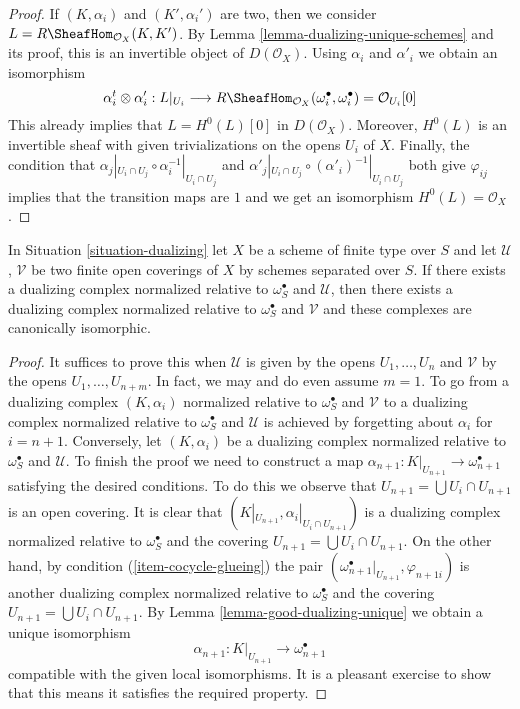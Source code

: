 \begin{proof}
If $(K, \alpha_i)$ and $(K', \alpha_i')$ are two, then we consider
$L = R\SheafHom_{\mathcal{O}_X}(K, K')$.
By Lemma \ref{lemma-dualizing-unique-schemes}
and its proof, this is an invertible object of $D(\mathcal{O}_X)$.
Using $\alpha_i$ and $\alpha'_i$ we obtain an isomorphism
$$
\alpha_i^t \otimes \alpha'_i :
L|_{U_i} \longrightarrow
R\SheafHom_{\mathcal{O}_X}(\omega_i^\bullet, \omega_i^\bullet) =
\mathcal{O}_{U_i}[0]
$$
This already implies that $L = H^0(L)[0]$ in $D(\mathcal{O}_X)$.
Moreover, $H^0(L)$ is an invertible sheaf with given trivializations
on the opens $U_i$ of $X$. Finally, the condition that
$\alpha_j|_{U_i \cap U_j} \circ \alpha_i^{-1}|_{U_i \cap U_j}$
and
$\alpha'_j|_{U_i \cap U_j} \circ (\alpha'_i)^{-1}|_{U_i \cap U_j}$
both give $\varphi_{ij}$ implies that the transition maps
are $1$ and we get an isomorphism $H^0(L) = \mathcal{O}_X$.
\end{proof}

\begin{lemma}
\label{lemma-good-dualizing-independence-covering}
In Situation \ref{situation-dualizing} let $X$ be a scheme of finite type
over $S$ and let $\mathcal{U}$, $\mathcal{V}$ be two finite open coverings
of $X$ by schemes separated over $S$.
If there exists a dualizing complex normalized
relative to $\omega_S^\bullet$ and $\mathcal{U}$, then
there exists a dualizing complex normalized relative to
$\omega_S^\bullet$ and $\mathcal{V}$ and these complexes are
canonically isomorphic.
\end{lemma}

\begin{proof}
It suffices to prove this when $\mathcal{U}$ is given by the opens
$U_1, \ldots, U_n$ and $\mathcal{V}$ by the opens $U_1, \ldots, U_{n + m}$.
In fact, we may and do even assume $m = 1$.
To go from a dualizing complex $(K, \alpha_i)$ normalized
relative to $\omega_S^\bullet$ and $\mathcal{V}$ to a
dualizing complex normalized relative to $\omega_S^\bullet$ and $\mathcal{U}$
is achieved by forgetting about $\alpha_i$ for $i = n + 1$. Conversely, let
$(K, \alpha_i)$ be a dualizing complex normalized relative to
$\omega_S^\bullet$ and $\mathcal{U}$.
To finish the proof we need to construct a map
$\alpha_{n + 1} : K|_{U_{n + 1}} \to \omega_{n + 1}^\bullet$ satisfying
the desired conditions.
To do this we observe that $U_{n + 1} = \bigcup U_i \cap U_{n + 1}$
is an open covering.
It is clear that $(K|_{U_{n + 1}}, \alpha_i|_{U_i \cap U_{n + 1}})$
is a dualizing complex normalized relative to $\omega_S^\bullet$
and the covering $U_{n + 1} = \bigcup U_i \cap U_{n + 1}$.
On the other hand, by condition (\ref{item-cocycle-glueing}) the pair
$(\omega_{n + 1}^\bullet|_{U_{n + 1}}, \varphi_{n + 1i})$
is another dualizing complex normalized relative to $\omega_S^\bullet$
and the covering
$U_{n + 1} = \bigcup U_i \cap U_{n + 1}$.
By Lemma \ref{lemma-good-dualizing-unique} we obtain a unique isomorphism
$$
\alpha_{n + 1} : K|_{U_{n + 1}} \longrightarrow \omega_{n + 1}^\bullet
$$
compatible with the given local isomorphisms.
It is a pleasant exercise to show that this means it satisfies
the required property.
\end{proof}

